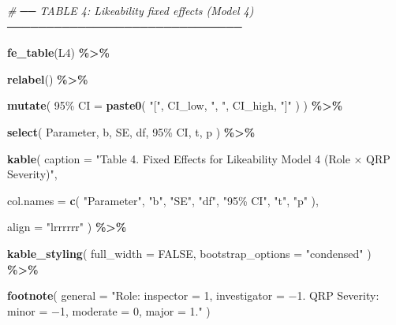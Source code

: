 \documentclass[
]{article}
\newenvironment{Shaded}{\begin{snugshade}}{\end{snugshade}}
\newcommand{\AttributeTok}[1]{\textcolor[rgb]{0.13,0.29,0.53}{#1}}
\newcommand{\CommentTok}[1]{\textcolor[rgb]{0.56,0.35,0.01}{\textit{#1}}}
\newcommand{\ConstantTok}[1]{\textcolor[rgb]{0.56,0.35,0.01}{#1}}
\newcommand{\FunctionTok}[1]{\textcolor[rgb]{0.13,0.29,0.53}{\textbf{#1}}}
\newcommand{\NormalTok}[1]{#1}
\newcommand{\OtherTok}[1]{\textcolor[rgb]{0.56,0.35,0.01}{#1}}
\newcommand{\SpecialCharTok}[1]{\textcolor[rgb]{0.81,0.36,0.00}{\textbf{#1}}}
\newcommand{\StringTok}[1]{\textcolor[rgb]{0.31,0.60,0.02}{#1}}
\begin{document}
\begin{Shaded}
\begin{Highlighting}[]
\CommentTok{\# ── TABLE 4: Likeability fixed effects (Model 4) ──────────────────────────────}

\FunctionTok{fe\_table}\NormalTok{(L4) }\SpecialCharTok{\%\textgreater{}\%}

  \FunctionTok{relabel}\NormalTok{() }\SpecialCharTok{\%\textgreater{}\%}

  \FunctionTok{mutate}\NormalTok{(}
    \StringTok{\textasciigrave{}}\AttributeTok{95\% CI}\StringTok{\textasciigrave{}} \OtherTok{=}
      \FunctionTok{paste0}\NormalTok{(}
        \StringTok{"["}\NormalTok{,}
\NormalTok{        CI\_low,}
        \StringTok{", "}\NormalTok{,}
\NormalTok{        CI\_high,}
        \StringTok{"]"}
\NormalTok{      )}
\NormalTok{  ) }\SpecialCharTok{\%\textgreater{}\%}

  \FunctionTok{select}\NormalTok{(}
\NormalTok{    Parameter,}
\NormalTok{    b,}
\NormalTok{    SE,}
\NormalTok{    df,}
    \StringTok{\textasciigrave{}}\AttributeTok{95\% CI}\StringTok{\textasciigrave{}}\NormalTok{,}
\NormalTok{    t,}
\NormalTok{    p}
\NormalTok{  ) }\SpecialCharTok{\%\textgreater{}\%}

  \FunctionTok{kable}\NormalTok{(}
    \AttributeTok{caption =}
      \StringTok{"Table 4. Fixed Effects for Likeability Model 4 (Role × QRP Severity)"}\NormalTok{,}

    \AttributeTok{col.names =} \FunctionTok{c}\NormalTok{(}
      \StringTok{"Parameter"}\NormalTok{,}
      \StringTok{"b"}\NormalTok{,}
      \StringTok{"SE"}\NormalTok{,}
      \StringTok{"df"}\NormalTok{,}
      \StringTok{"95\% CI"}\NormalTok{,}
      \StringTok{"t"}\NormalTok{,}
      \StringTok{"p"}
\NormalTok{    ),}

    \AttributeTok{align =} \StringTok{"lrrrrrr"}
\NormalTok{  ) }\SpecialCharTok{\%\textgreater{}\%}

  \FunctionTok{kable\_styling}\NormalTok{(}
    \AttributeTok{full\_width =} \ConstantTok{FALSE}\NormalTok{,}
    \AttributeTok{bootstrap\_options =} \StringTok{"condensed"}
\NormalTok{  ) }\SpecialCharTok{\%\textgreater{}\%}

  \FunctionTok{footnote}\NormalTok{(}
    \AttributeTok{general =}
      \StringTok{"Role: inspector = 1, investigator = −1. QRP Severity: minor = −1, moderate = 0, major = 1."}
\NormalTok{  )}
\end{Highlighting}
\end{Shaded}
\end{document}
